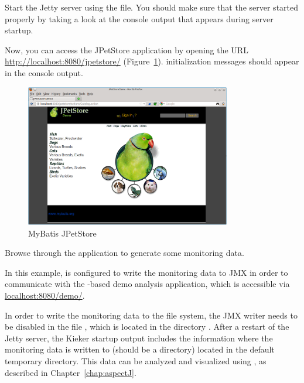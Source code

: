 \begin{compactenum}
\item Start the Jetty server using the  file. You should make %
   sure that the server started properly by taking a look at %
   the console output that appears during server startup.  
\item Now, you can access the JPetStore application by opening the URL
   \url{http://localhost:8080/jpetstore/} (Figure~\ref{fig:jpetstore}). %
   \Kieker{} initialization messages should appear in the console output. %
   
\begin{figure}[h]\centering
\includegraphics[width=0.8\textwidth]{images/jpetstore-example-FFscrsh}
\caption{MyBatis JPetStore}\label{fig:jpetstore}%
\end{figure}
   
\item   Browse through the application to generate some monitoring data. %
\item In this example, \Kieker{} is configured to write the monitoring data %
      to JMX in order to communicate with the \Kieker-based demo analysis %
      application, which is accessible via \url{localhost:8080/demo/}.
   
\item In order to write the monitoring data to the file system, the %
      JMX writer needs to be disabled in the file , %
      which is located in the directory .
      After a restart of the Jetty server, the Kieker startup output includes the %
      information where the monitoring data is written to (should be a %
       directory) located in the default temporary %
      directory. %
   This data can be analyzed and visualized using \KiekerTraceAnalysis{}, %
   as described in Chapter~\ref{chap:aspectJ}.
\end{compactenum}

\medskip

 